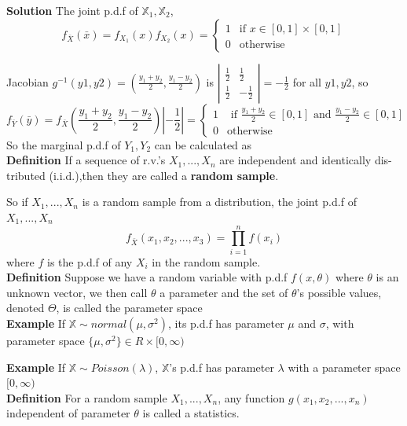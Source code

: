 \documentclass[a4paper,12pt]{article}
\begin{document}
\textbf{Solution}
The joint p.d.f of $\mathbb{X}_1, \mathbb{X}_2$,
$$f_{\bar{X}}(\bar{x}) = f_{X_1}(x)f_{X_2}(x) = 
\begin{cases}
   1  & \text{if } x \in [0,1] \times [0,1] \\
   0 & \text{otherwise}
  \end{cases}
$$

Jacobian  $g^{-1}(y1, y2) = (\frac{y_1+y_2}{2}, \frac{y_1-y_2}{2})$ is
$\left| \begin{array}{ccc}
\frac{1}{2} & \frac{1}{2} \\
\frac{1}{2} & -\frac{1}{2} \end{array} \right| = -\frac{1}{2}$ for all $y1, y2$, so
$$f_{\bar{Y}}(\bar{y}) = f_{\bar{X}}(\frac{y_1+y_2}{2}, \frac{y_1-y_2}{2})| -\frac{1}{2} | = 
\begin{cases}
1 & \text{ if } \frac{y_1+y_2}{2} \in [0,1] \text{ and } \frac{y_1-y_2}{2} \in [0,1]\\
0 & \text{otherwise}

\end{cases}
$$
So the marginal p.d.f of $Y_1, Y_2$ can be calculated as\\

\textbf{Definition} If a sequence of r.v.’s $X_1, ..., X_n$ are independent and identically dis-
tributed (i.i.d.),then they are called a \textbf{random sample}.

So if $X_1, ..., X_n$ is a random sample from a distribution, the joint p.d.f of $X_1, ..., X_n$
$$f_{\bar{X}}(x_1, x_2, ..., x_3) =  \prod_{i=1}^n f(x_i)$$
where $f$ is the p.d.f of any $X_i$ in the random sample.\\
 
\textbf{Definition}
Suppose we have a random variable with p.d.f $f(x, \theta)$ where $\theta$ is an unknown vector, we then call $\theta$ a parameter and the set of $\theta$'s possible values, denoted $\Theta$, is called the parameter space\\

\textbf{Example}
If $\mathbb{X} \sim normal(\mu, \sigma^2)$, its p.d.f has parameter $\mu$ and $\sigma$, with parameter space $\{\mu, \sigma^2\} \in R \times
[0, \infty)$

\textbf{Example}
If $\mathbb{X} \sim Poisson(\lambda)$, $\mathbb{X}$'s p.d.f has parameter $\lambda$ with a parameter space $[0, \infty)$\\

\textbf{Definition}
For a random sample $X_1, ..., X_n$, any function $g(x_1, x_2, ..., x_n)$ independent of parameter $\theta$ is called a statistics.\\
\end{document}
